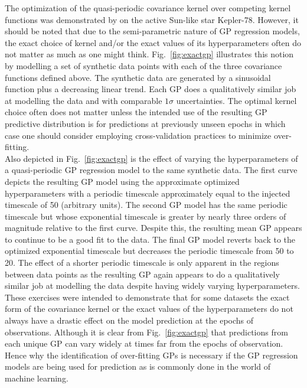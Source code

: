 The optimization of the quasi-periodic covariance kernel over competing kernel functions
was demonstrated by \cite{grunblatt15} on the active Sun-like star Kepler-78. However, it
should be noted that due to the semi-parametric nature of GP regression models, the exact
choice of kernel and/or the exact values of its hyperparameters often do not matter as
much as one might think. Fig.~\ref{fig:exactgp} illustrates this notion by modelling a
set of synthetic data points with each of the three covariance functions defined above.
The synthetic data are generated by a sinusoidal function plus a decreasing linear trend. 
Each GP does a qualitatively similar job at modelling the data and with comparable $1\sigma$
uncertainties. The optimal kernel choice often does not matter unless the intended use of the 
resulting GP predictive distribution is for predictions at previously unseen epochs in which case 
one should consider employing cross-validation practices to minimize over-fitting. \\

Also depicted in Fig.~\ref{fig:exactgp} is the effect of varying the hyperparameters of
a quasi-periodic GP regression model to the same synthetic data. The first curve depicts
the resulting GP model using the approximate optimized hyperparameters with a periodic
timescale approximately equal to the injected timescale of 50 (arbitrary units). The second
GP model has the same periodic timescale but whose exponential timescale is greater by nearly
three orders of magnitude relative to the first curve.
Despite this, the resulting mean GP appears to continue to be a good
fit to the data. The final GP model reverts back to the optimized exponential timescale but
decreases the periodic timescale from 50 to 20. The effect of a shorter periodic timescale
is only apparent in the regions between data points as the resulting GP again appears to do
a qualitatively similar job at modelling the data despite having widely varying hyperparameters. \\

These exercises were intended to demonstrate that for some datasets the exact form of the covariance
kernel or the exact values of the hyperparameters do not always have a drastic effect on the
model prediction at the epochs of observations. Although it is clear from Fig.~\ref{fig:exactgp}
that predictions from each unique GP can vary widely at times far from the epochs of observation. 
Hence why the identification of over-fitting GPs is necessary if the GP regression models are being used 
for prediction as is commonly done in the world of machine learning.

